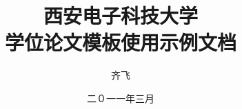 \documentclass[bachelor]{xdthesis}
\begin{document}
\title{西安电子科技大学\\\XeLaTeX{}学位论文模板使用示例文档}
\author{齐飞}
\date{二０一一年三月}
\maketitle



\frontmatter
\tableofcontents

\mainmatter


% 
% 
% 
% 

% 
% 
\end{document}
